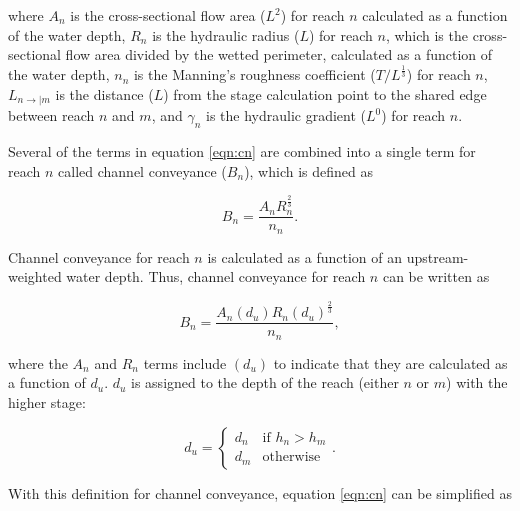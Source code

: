 \documentclass[fleqn]{article}
\begin{document}


\noindent where $A_n$ is the cross-sectional flow area ($L^2$) for reach $n$ calculated as a function of the water depth, $R_n$ is the hydraulic radius ($L$) for reach $n$, which is the cross-sectional flow area divided by the wetted perimeter, calculated as a function of the water depth, $n_n$ is the Manning's roughness coefficient ($T/L^{\frac{1}{3}}$) for reach $n$,  $L_{n \rightarrow | m}$ is the distance ($L$) from the stage calculation point to the shared edge between reach $n$ and $m$, and $\gamma_n$ is the hydraulic gradient ($L^0$) for reach $n$.

Several of the terms in equation \ref{eqn:cn} are combined into a single term for reach $n$ called channel conveyance ($B_n$), which is defined as

\begin{equation}
  B_n = \frac{A_n R_n^{\frac{2}{3}}}{n_n}.
\label{eqn:conveyance}
\end{equation}

\noindent Channel conveyance for reach $n$ is calculated as a function of an upstream-weighted water depth.  Thus, channel conveyance for reach $n$ can be written as

\begin{equation}
  B_n = \frac{A_n (d_u) R_n (d_u) ^{\frac{2}{3}}}{n_n},
\label{eqn:conveyancedu}
\end{equation}

\noindent where the $A_n$ and $R_n$ terms include $(d_u)$ to indicate that they are calculated as a function of $d_u$.  $d_u$ is assigned to the depth of the reach (either $n$ or $m$) with the higher stage:

\[
d_u = 
\begin{cases}
  d_n & \text{if $h_n>h_m$} \\
  d_m & \text{otherwise}
\end{cases}.
\]

With this definition for channel conveyance, equation \ref{eqn:cn} can be simplified as
\end{document}
